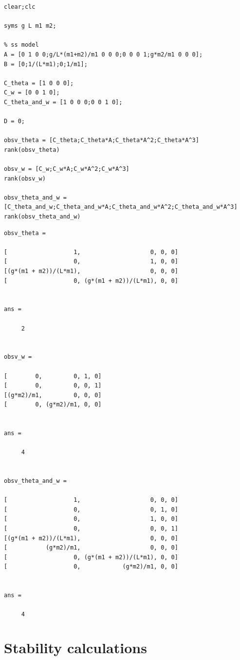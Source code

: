 \documentclass[12pt]{article}
\numberwithin{equation}{section}
\begin{document}
    \begin{verbatim}
clear;clc

syms g L m1 m2;

% ss model
A = [0 1 0 0;g/L*(m1+m2)/m1 0 0 0;0 0 0 1;g*m2/m1 0 0 0];
B = [0;1/(L*m1);0;1/m1];

C_theta = [1 0 0 0];
C_w = [0 0 1 0];
C_theta_and_w = [1 0 0 0;0 0 1 0];

D = 0;

obsv_theta = [C_theta;C_theta*A;C_theta*A^2;C_theta*A^3]
rank(obsv_theta)

obsv_w = [C_w;C_w*A;C_w*A^2;C_w*A^3]
rank(obsv_w)

obsv_theta_and_w = [C_theta_and_w;C_theta_and_w*A;C_theta_and_w*A^2;C_theta_and_w*A^3]
rank(obsv_theta_and_w)
\end{verbatim}

        \color{lightgray} \begin{verbatim} 
obsv_theta =
 
[                   1,                    0, 0, 0]
[                   0,                    1, 0, 0]
[(g*(m1 + m2))/(L*m1),                    0, 0, 0]
[                   0, (g*(m1 + m2))/(L*m1), 0, 0]
 

ans =

     2

 
obsv_w =
 
[        0,         0, 1, 0]
[        0,         0, 0, 1]
[(g*m2)/m1,         0, 0, 0]
[        0, (g*m2)/m1, 0, 0]
 

ans =

     4

 
obsv_theta_and_w =
 
[                   1,                    0, 0, 0]
[                   0,                    0, 1, 0]
[                   0,                    1, 0, 0]
[                   0,                    0, 0, 1]
[(g*(m1 + m2))/(L*m1),                    0, 0, 0]
[           (g*m2)/m1,                    0, 0, 0]
[                   0, (g*(m1 + m2))/(L*m1), 0, 0]
[                   0,            (g*m2)/m1, 0, 0]
 

ans =

     4

\end{verbatim} \color{black}

\section{Stability calculations}
\end{document}
